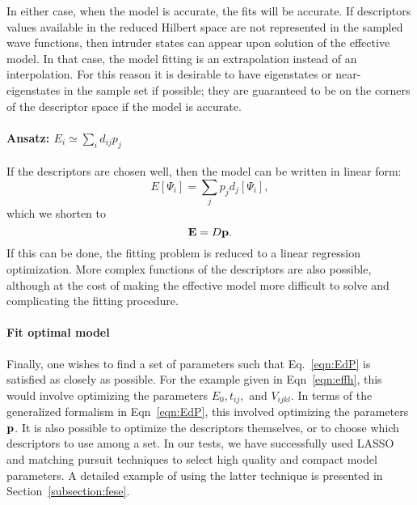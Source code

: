 In either case, when the model is accurate, the fits will be accurate.
If descriptors values available in the reduced Hilbert space are not represented in the sampled wave functions, then intruder states can appear upon solution of the effective model. 
In that case, the model fitting is an extrapolation instead of an interpolation.
For this reason it is desirable to have eigenstates or near-eigenstates in the sample set if possible; they are guaranteed to be on the corners of the descriptor space if the model is accurate.


\paragraph{Ansatz: $E_i \simeq \sum_i  d_{ij} p_j$} 
If the descriptors are chosen well, then the model can be written in linear form:
\begin{equation}\label{eq:linearfit_descriptor}
E[\Psi_i] = \sum_j p_j d_j[\Psi_i],	
\end{equation}
which we shorten to 
\begin{equation}
{\bf E} = D{\bf p} .
\label{eqn:EdP}
\end{equation}
If this can be done, the fitting problem is reduced to a linear regression optimization.
More complex functions of the descriptors are also possible, although at the cost of making the effective model more difficult to solve and complicating the fitting procedure.


\paragraph{Fit optimal model}
Finally, one wishes to find a set of parameters such that Eq.~\eqref{eqn:EdP} is satisfied as closely as possible. 
For the example given in Eqn~\ref{eqn:effh}, this would involve optimizing the parameters $E_0,t_{ij}, $ and $V_{ijkl}$. 
In terms of the generalized formalism in Eqn~\ref{eqn:EdP}, this involved optimizing the parameters ${\bf p}$. 
It is also possible to optimize the descriptors themselves, or to choose which descriptors to use among a set. 
In our tests, we have successfully used LASSO \cite{Lasso} and matching pursuit techniques \cite{MP_Zhang1993} to select high quality and compact model parameters. 
A detailed example of using the latter technique is presented in Section~\ref{subsection:fese}.


